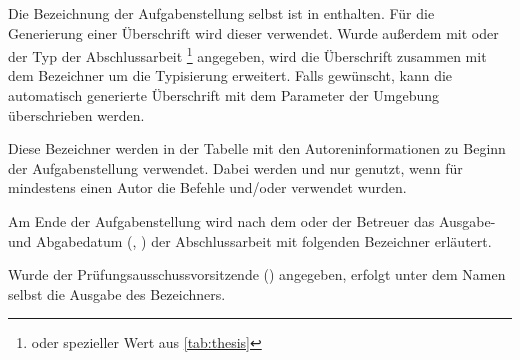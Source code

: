 \begin{Declaration*}{}
\begin{Declaration}{}
\begin{Declaration}{}
\printdeclarationlist%
%
Die Bezeichnung der Aufgabenstellung selbst ist in  enthalten. 
Für die Generierung einer Überschrift wird dieser verwendet. Wurde außerdem mit 
 oder  der Typ der Abschlussarbeit%
\footnote{%
   oder spezieller Wert aus \autoref{tab:thesis}
}
angegeben, wird die Überschrift zusammen mit dem Bezeichner 
um die Typisierung erweitert. Falls gewünscht, kann die automatisch generierte 
Überschrift mit dem Parameter  der Umgebung 
 überschrieben werden.
\end{Declaration}
\end{Declaration}

\begin{Declaration}{}
\begin{Declaration}{}
\begin{Declaration}{}
\begin{Declaration}{}
\printdeclarationlist%
%
Diese Bezeichner werden in der Tabelle mit den Autoreninformationen zu Beginn 
der Aufgabenstellung verwendet. Dabei werden  und 
 nur genutzt, wenn für mindestens einen Autor die Befehle 
 und/oder  verwendet wurden.
\end{Declaration}
\end{Declaration}
\end{Declaration}
\end{Declaration}

\begin{Declaration}{}
\begin{Declaration}{}
\printdeclarationlist%
%
Am Ende der Aufgabenstellung wird nach dem oder der Betreuer das Ausgabe- und 
Abgabedatum (, ) der Abschlussarbeit mit 
folgenden Bezeichner erläutert.
\end{Declaration}
\end{Declaration}

\begin{Declaration}{}
\printdeclarationlist%
%
Wurde der Prüfungsausschussvorsitzende () angegeben, erfolgt 
unter dem Namen selbst die Ausgabe des Bezeichners.
\end{Declaration}


\end{Declaration*}
